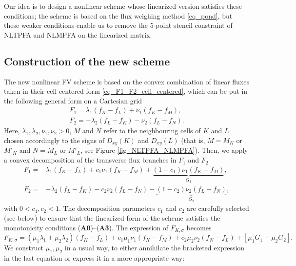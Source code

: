 \documentclass[final,11pt]{elsarticle}
\begin{document}
Our idea is to design a nonlinear scheme whose linearized version satisfies these conditions; the scheme is based on the flux weighing method \eqref{eq_pond}, but these weaker conditions enable us to remove the 5-point stencil constraint of NLTPFA and NLMPFA on the linearized matrix.

\subsection{Construction of the new scheme}\label{sec:construction.scheme}

The new nonlinear FV scheme is based on the convex combination of linear fluxes taken in their cell-centered form \eqref{eq_F1_F2_cell_centered}, which can be put in the following general form on a Cartesian grid 
\begin{equation}
\begin{gathered}
    F_1=\lambda_1(f_K-f_L)+\nu_1(f_K-f_M),\\
    F_2=-\lambda_2(f_L-f_K)-\nu_2(f_L-f_N).
    \label{eq_F1_F2_lambda}
\end{gathered}
\end{equation}
Here, $\lambda_1,\lambda_2,\nu_1,\nu_2>0$, $M$ and $N$ refer to the neighbouring cells of $K$ and $L$ chosen accordingly to the signs of $D_{xy}(K)$ and $D_{xy}(L)$ (that is, $M=M_K$ or $M'_K$ and $N=M_L$ or $M'_L$, see Figure \ref{fig_NLTPFA_NLMPFA}). Then, we apply a convex decomposition of the transverse flux branches in $F_1$ and $F_2$
\begin{equation}
\begin{aligned}
F_1={}&\lambda_1(f_K-f_L)
+c_1\nu_{1}(f_K-f_{M})+\underbrace{(1-c_1)\nu_{1}(f_K-f_{M})}_{G_1},\\
F_2={}&-\lambda_{2}(f_L-f_K)
-c_2\nu_{2}(f_{L}-f_N)-\underbrace{(1-c_2)\nu_{2}(f_{L}-f_N)}_{G_2},
\end{aligned}
\end{equation}
with $0<c_1,c_2<1$. The decomposition parameters $c_1$ and $c_2$ are carefully selected (see below) to ensure that the linearized form of the scheme satisfies the monotonicity conditions (\textbf{A0})--(\textbf{A3}). The expression of $F_{K,\sigma}$ becomes
\begin{equation}
    F_{K,\sigma}=(\mu_1\lambda_1+\mu_2\lambda_2)(f_K-f_L)+
    c_1\mu_1\nu_1(f_K-f_{M})+c_2\mu_2\nu_2(f_N-f_L)+
    [\mu_1G_1-\mu_2G_2].
\label{eq_flux_G1G2}
\end{equation}
We construct $\mu_1,\mu_2$ in a usual way, to either annihilate the bracketed expression in the last equation or express it in a more appropriate way:
\end{document}
